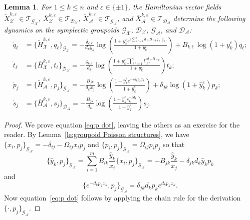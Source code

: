 \documentclass{amsart}
\newtheorem{lemma}[theorem]{Lemma}
\numberwithin{equation}{section}
\newcommand{\cA}{\mathcal{A}}
\newcommand{\cG}{\mathcal{G}}
\renewcommand{\cD}{\mathcal{D}}
\newcommand{\cX}{\mathcal{X}}
\newcommand{\cT}{\mathcal{T}}
\begin{document}
\begin{lemma}
  For $1\le k\le n$ and $\varepsilon\in\{\pm1\}$, the Hamiltonian vector fields $\tilde X_\cX^{k,\varepsilon}\in\cT_{\cG_\cX}$, $\bar X_\cX^{k,\varepsilon}\in\cT_{\cD_\cX}$, $\tilde X_\cA^{k,\varepsilon}\in\cT_{\cG_\cA}$, and $\bar X_\cA^{k,\varepsilon}\in\cT_{\cD_\cA}$ determine the following dynamics on the symplectic groupoids $\cG_\cX$, $\cD_\cX$, $\cG_\cA$, and $\cD_\cA$:
  \begin{align}
    \dot q_\ell&=\{\tilde H_\cX^{k,\varepsilon},q_\ell\}_{\cG_\cX}=-\frac{\delta_{k\ell}}{d_ky_k}\log\left(\frac{1+y_k^\varepsilon e^{\varepsilon\sum_{\ell'=1}^n d_{\ell'} B_{\ell' k}q_{\ell'} y_{\ell'}}}{1+y_k^\varepsilon}\right)+B_{k\ell}\log(1+y_k^\varepsilon)q_\ell;\\
    \dot t_\ell&=\{\bar H_\cX^{k,\varepsilon},t_\ell\}_{\cD_\cX}=-\frac{\delta_{k\ell}}{d_k}\log\left(\frac{1+y_k^\varepsilon \prod_{\ell'=1}^nt_{\ell'}^{\varepsilon d_{\ell'} B_{\ell' k}}}{1+y_k^\varepsilon}\right)t_k;\\
    \label{eq:p dot}\dot p_j&=\{\tilde H_\cA^{k,\varepsilon},p_j\}_{\cG_\cA}=-\frac{B_{jk}}{d_kx_j}\log\left(\frac{1+\hat y_k^\varepsilon e^{-\varepsilon d_kp_kx_k}}{1+\hat y_k^\varepsilon}\right)+\delta_{jk}\log(1+\hat y_k^\varepsilon)p_k;\\
    \label{eq:s dot}\dot s_j&=\{\bar H_\cA^{k,\varepsilon},s_j\}_{\cD_\cA}=-\frac{B_{jk}}{d_k}\log\left(\frac{1+\hat y_k^\varepsilon s_k^{-\varepsilon d_k}}{1+\hat y_k^\varepsilon}\right)s_j.
  \end{align}
\end{lemma}
\begin{proof}
  We prove equation \eqref{eq:p dot}, leaving the others as an exercise for the reader.
  By Lemma~\ref{le:groupoid Poisson structures}, we have $\{x_i,p_j\}_{\cG_\cA}=-\delta_{ij}-\Omega_{ij}x_ip_j$ and $\{p_i,p_j\}_{\cG_\cA}=\Omega_{ij}p_ip_j$ so that
  \[\{\hat y_k,p_j\}_{\cG_\cA}=\sum_{i=1}^m B_{ik}\frac{\hat y_k}{x_i}\{x_i,p_j\}_{\cG_\cA}=-B_{jk}\frac{\hat y_k}{x_j}-\delta_{jk}d_k\hat y_kp_k\]
  and
  \[\{e^{-d_kp_kx_k},p_j\}_{\cG_\cA}=\delta_{jk}d_kp_ke^{d_kp_kx_k}.\]
  Now equation~\eqref{eq:p dot} follows by applying the chain rule for the derivation $\{\cdot,p_j\}_{\cG_\cA}$.
\end{proof}
\end{document}
